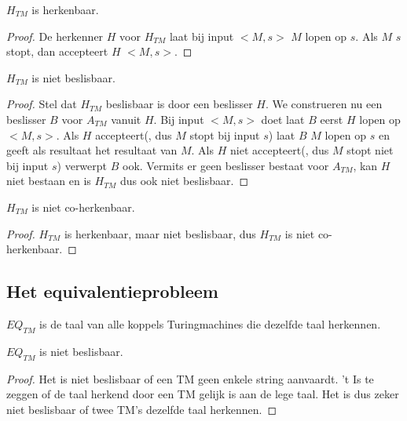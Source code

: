 \documentclass[main.tex]{subfiles}
\begin{document}
\begin{st}
  \label{st:h-tm-herk}
  $H_{TM}$ is herkenbaar.
  \begin{proof}
    De herkenner $H$ voor $H_{TM}$ laat bij input $<M,s>$ $M$ lopen op $s$.
    Als $M$ $s$ stopt, dan accepteert $H$ $<M,s>$.
  \end{proof}
\end{st}

\begin{st}
  \label{st:h-tm-niet-besl}
  $H_{TM}$ is niet beslisbaar.

  \begin{proof}
    Stel dat $H_{TM}$ beslisbaar is door een beslisser $H$.
    We construeren nu een beslisser $B$ voor $A_{TM}$ vanuit $H$.
    Bij input $<M,s>$ doet laat $B$ eerst $H$ lopen op $<M,s>$.
    Als $H$ accepteert(, dus $M$ stopt bij input $s$) laat $B$ $M$ lopen op $s$ en geeft als resultaat het resultaat van $M$.
    Als $H$ niet accepteert(, dus $M$ stopt niet bij input $s$) verwerpt $B$ ook.
    Vermits er geen beslisser bestaat voor $A_{TM}$, kan $H$ niet bestaan en is $H_{TM}$ dus ook niet beslisbaar.
  \end{proof}
\end{st}

\begin{gev}
  \label{gev:h-tm-niet-coherk}
  $H_{TM}$ is niet co-herkenbaar.
  \begin{proof}
    $H_{TM}$ is herkenbaar, maar niet beslisbaar, dus $H_{TM}$ is niet co-herkenbaar.
  \end{proof}
\end{gev}

\subsection{Het equivalentieprobleem}

\begin{de}
  \label{de:eq-tm}
  $EQ_{TM}$ is de taal van alle koppels Turingmachines die dezelfde taal herkennen.
\end{de}

\begin{st}
  \label{st:eq-tm-besl}
  $EQ_{TM}$ is niet beslisbaar.

  \begin{proof}
    Het is niet beslisbaar of een TM geen enkele string aanvaardt.
    't Is te zeggen of de taal herkend door een TM gelijk is aan de lege taal.
    Het is dus zeker niet beslisbaar of twee TM's dezelfde taal herkennen.
  \end{proof}
\end{st}
\end{document}
